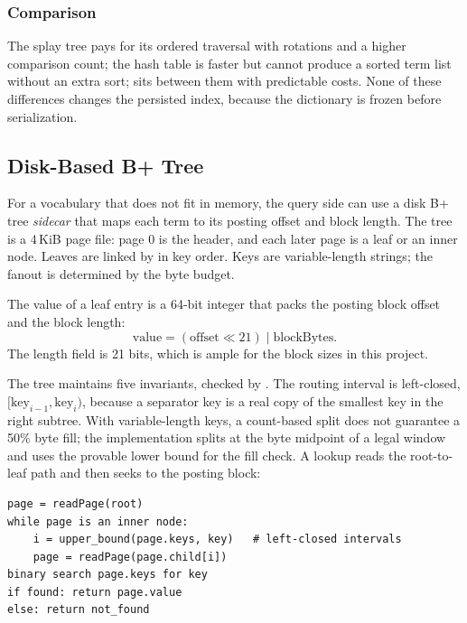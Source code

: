 \subsubsection{Comparison}

The splay tree pays for its ordered traversal with rotations and a higher
comparison count; the hash table is faster but cannot produce a sorted term
list without an extra sort;  sits between them with predictable
costs. None of these differences changes the persisted index, because the
dictionary is frozen before serialization.

\subsection{Disk-Based B+ Tree}
\label{sec:bptree-design}

For a vocabulary that does not fit in memory, the query side can use a disk B+
tree \emph{sidecar} that maps each term to its posting offset and block length.
The tree is a 4\,KiB page file: page 0 is the header, and each later page is a
leaf or an inner node. Leaves are linked by  in key order. Keys
are variable-length strings; the fanout is determined by the byte budget.

The value of a leaf entry is a 64-bit integer that packs the posting block
offset and the block length:
\begin{equation}
  \mathrm{value}=(\mathrm{offset}\ll 21)\;|\;\mathrm{blockBytes}.
\end{equation}
The length field is 21 bits, which is ample for the block sizes in this
project.

The tree maintains five invariants, checked by . The routing
interval is left-closed, $[\mathrm{key}_{i-1},\mathrm{key}_i)$, because a
separator key is a real copy of the smallest key in the right subtree. With
variable-length keys, a count-based split does not guarantee a 50\% byte fill;
the implementation splits at the byte midpoint of a legal window and uses the
provable lower bound  for the fill check. A lookup
reads the root-to-leaf path and then seeks to the posting block:

\begin{lstlisting}[style=cli]
page = readPage(root)
while page is an inner node:
    i = upper_bound(page.keys, key)   # left-closed intervals
    page = readPage(page.child[i])
binary search page.keys for key
if found: return page.value
else: return not_found
\end{lstlisting}

